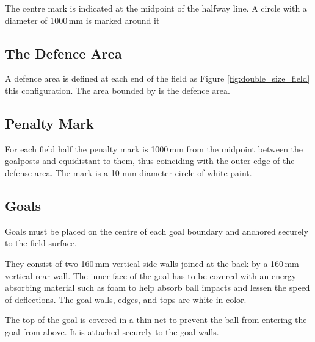 The centre mark is indicated at the midpoint of the halfway line.
A  circle  with  a  diameter  of 1000\,mm is marked around it 

\subsection{The Defence Area}

A defence area is defined at each end of the field as 
  Figure \ref{fig:double_size_field}  this configuration.
The area bounded by  is
the defence area.


\subsection{Penalty Mark}

For each field half the penalty mark is 1000\,mm from the midpoint between the goalposts and
equidistant to them, thus coinciding with the outer edge of the defense area. The mark is a 10 mm
diameter circle of white paint.

\subsection{Goals}
Goals must be placed on the centre of each goal boundary and anchored
securely to the field surface.

They consist of two 160\,mm vertical side walls joined at the back by a 160\,mm
vertical rear wall. The inner face of the goal has to be covered with an energy
absorbing material such as foam to help absorb ball impacts and lessen the speed
of deflections.
The goal walls, edges, and tops are white in color.

The top of the goal is covered in a thin net to prevent the ball
from entering the goal from above. It is attached securely to the 
goal walls.

